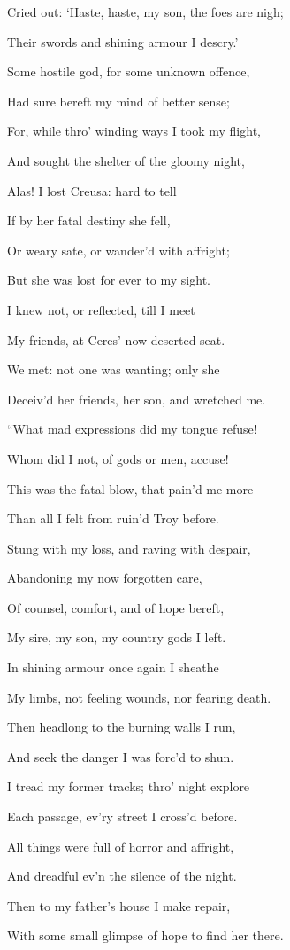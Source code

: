 Cried out: ‘Haste, haste, my son, the foes are nigh;

Their swords and shining armour I descry.’

Some hostile god, for some unknown offence,

Had sure bereft my mind of better sense;

For, while thro’ winding ways I took my flight,

And sought the shelter of the gloomy night,

Alas! I lost Creusa: hard to tell

If by her fatal destiny she fell,

Or weary sate, or wander’d with affright;

But she was lost for ever to my sight.

I knew not, or reflected, till I meet

My friends, at Ceres’ now deserted seat.

We met: not one was wanting; only she

Deceiv’d her friends, her son, and wretched me.

“What mad expressions did my tongue refuse!

Whom did I not, of gods or men, accuse!

This was the fatal blow, that pain’d me more

Than all I felt from ruin’d Troy before.

Stung with my loss, and raving with despair,

Abandoning my now forgotten care,

Of counsel, comfort, and of hope bereft,

My sire, my son, my country gods I left.

In shining armour once again I sheathe

My limbs, not feeling wounds, nor fearing death.

Then headlong to the burning walls I run,

And seek the danger I was forc’d to shun.

I tread my former tracks; thro’ night explore

Each passage, ev’ry street I cross’d before.

All things were full of horror and affright,

And dreadful ev’n the silence of the night.

Then to my father’s house I make repair,

With some small glimpse of hope to find her there.

